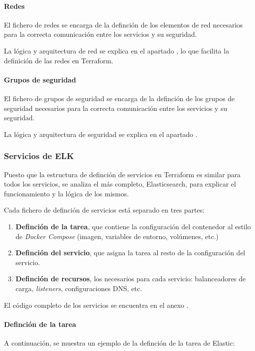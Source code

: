 \paragraph{Redes}
El fichero de redes  se encarga de la definción
de los elementos de red necesarios para la correcta comunicación entre los
servicios y su seguridad.

La lógica y arquitectura de red se explica en el apartado
, lo que facilita la definición de las redes en Terraform.


\paragraph{Grupos de seguridad}
El fichero de grupos de seguridad  se encarga
de la definción de los grupos de seguridad necesarios para la correcta
comunicación entre los servicios y su seguridad.

La lógica y arquitectura de seguridad se explica en el apartado
.


\newpage{}
\subsubsection{Servicios de ELK}
Puesto que la estructura de definción de servicios en Terraform es similar para
todos los servicios, se analiza el más completo, Elasticsearch, para explicar el
funcionamiento y la lógica de los mismos.

Cada fichero de definción de servicios está separado en tres partes:
\begin{enumerate}
	\item \textbf{Definción de la tarea}, que contiene la configuración del
		contenedor al estilo de \textit{Docker Compose} (imagen, variables de
    entorno, volúmenes, etc.)
	\item \textbf{Definción del servicio}, que asigna la tarea al resto de la
		configuración del servicio.
	\item \textbf{Definción de recursos}, los necesarios para cada servicio:
		balanceadores de carga, \textit{listeners}, configuraciones DNS, etc.
\end{enumerate}

El código completo de los servicios se encuentra en el anexo .

\paragraph{Definción de la tarea}
A continuación, se muestra un ejemplo de la definción de la tarea de Elastic:

